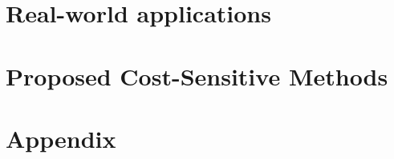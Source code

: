 \documentclass[twoside,openright,titlepage,numbers=noenddot,headinclude,%
               footinclude=true,cleardoublepage=empty,abstractoff,BCOR=5mm,%
               paper=a4,fontsize=12pt,ngerman,american]{scrreprt} %
\numberwithin{theorem}{chapter}
\numberwithin{definition}{chapter}
\numberwithin{algorithm}{chapter}
\numberwithin{figure}{chapter}
\numberwithin{table}{chapter}
\numberwithin{equation}{chapter}
\begin{document}
\frenchspacing
\raggedbottom
{}
\pagestyle{plain}



\cleardoublepage
\cleardoublepage
\cleardoublepage
\cleardoublepage
\pagestyle{scrheadings}
\cleardoublepage



\cleardoublepage
\cleardoublepage

\part{Real-world applications}\label{part:1}

  \cleardoublepage
  \cleardoublepage

\part{Proposed Cost-Sensitive Methods}\label{part:2}

  \cleardoublepage
  \cleardoublepage
  \cleardoublepage
  \cleardoublepage
  \cleardoublepage

\cleardoublepage
\makeatletter
\def\toclevel@chapter{-1}
\makeatother
    



\appendix
\cleardoublepage
\part{Appendix}

\cleardoublepage
\cleardoublepage
		
\end{document}
